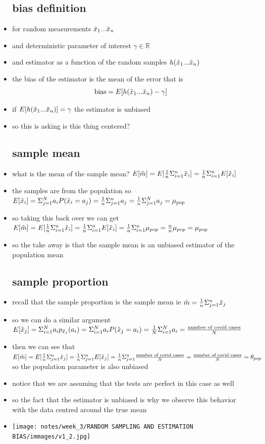 \documentclass{article}
\begin{document}
\begin{itemize}
\subsection{bias definition}
\item for random measurements $\Tilde{x}_1...\Tilde{x}_n$ 
\item and deterministic parameter of interest $\gamma \in \mathbb{R}$
\item and estimator as a function of the random samples $h(\Tilde{x}_1...\Tilde{x}_n)$ 
\item the bias of the estimator is the mean of the error that is $$\text{bias}=E[h(\Tilde{x}_1...\Tilde{x}_n) -\gamma]$$
\item if $E[h(\Tilde{x}_1...\Tilde{x}_n)]=\gamma$ the estimator is unbiased
\item so this is asking is this thing centered?
\subsection{sample mean}
\item what is the mean of the sample mean? $E[\Tilde{m}]=E[\frac{1}{n}\Sigma_{i=1}^{n}\Tilde{x}_{i}]=\frac{1}{n}\Sigma_{i=1}^{n}E[\Tilde{x}_i]$
\item the samples are from the population so $E[\Tilde{x}_i]=\Sigma_{j=1}^{N}a_iP(\Tilde{x}_i=a_{j})=\frac{1}{n}\Sigma_{j=1}^{n}a_j=\frac{1}{n}\Sigma_{j=1}^{N}a_j=\mu_{pop}$
\item so taking this back over we can get $E[\Tilde{m}]=E[\frac{1}{n}\Sigma_{i=1}^{n}\Tilde{x}_{i}]=\frac{1}{n}\Sigma_{i=1}^{n}E[\Tilde{x}_i]=\frac{1}{n}\Sigma_{i=1}^{n}\mu_{pop}=\frac{n}{n}\mu_{pop}=\mu_{pop}$
\item so the take away is that the sample mean is an unbiased estimator of the population mean 
\subsection{sample proportion}
\item recall that the sample proportion is the sample mean ie $\Tilde{m}=\frac{1}{n}\Sigma_{j=1}^{n}\Tilde{x}_j$
\item so we can do a similar argument  $E[\Tilde{x}_j]=\Sigma_{i=1}^{N}a_ip_{\Tilde{x}_j}(a_i)=\Sigma_{i=1}^{N}a_iP(\Tilde{x}_j=a_i)=\frac{1}{N}\Sigma_{i=1}^{N}a_i=\frac{\text{number of covid cases}}{N}$
\item then we can see that 
$E[\Tilde{m}]=E[\frac{1}{n}\Sigma_{j=1}^{n}\Tilde{x}_j]=\frac{1}{n}\Sigma_{j=1}^{n}E[\Tilde{x}_j]=\frac{1}{n}\Sigma_{j=1}^{n}\frac{\text{number of covid cases}}{N}=\frac{\text{number of covid cases}}{N}=\theta_{pop}$ so the population parameter is also unbiased
\item notice that we are assuming that the tests are perfect in this case as well
\item so the fact that the estimator is unbiased is why we observe this behavior with the data centred around the true mean 
\item\texttt{[image: notes/week\_3/RANDOM SAMPLING AND ESTIMATION BIAS/immages/v1\_2.jpg]}

\end{itemize}
\end{document}
